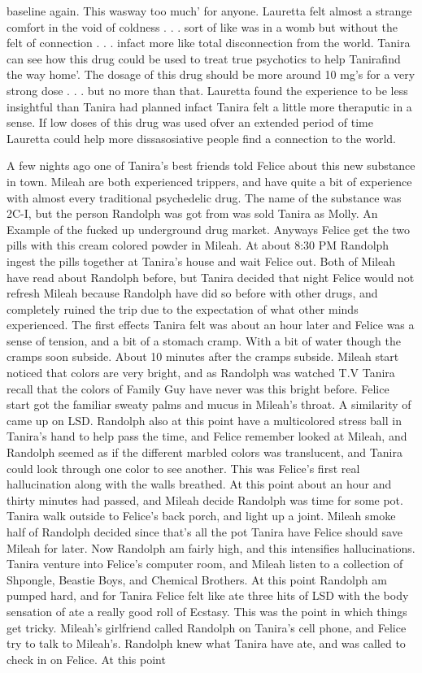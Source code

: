 \documentclass[12pt]{book}
\begin{document}
baseline again. This wasway too much' for anyone. Lauretta felt almost a strange comfort in the void of coldness . . .  sort of like was in a womb but without the felt of connection . . .  infact more like total disconnection from the world. Tanira can see how this drug could be used to treat true psychotics to help Tanirafind the way home'. The dosage of this drug should be more around 10 mg's for a very strong dose . . .  but no more than that. Lauretta found the experience to be less insightful than Tanira had planned infact Tanira felt a little more theraputic in a sense. If low doses of this drug was used ofver an extended period of time Lauretta could help more dissasosiative people find a connection to the world.



A few nights ago one of Tanira's best friends told Felice about this new substance in town. Mileah are both experienced trippers, and have quite a bit of experience with almost every traditional psychedelic drug. The name of the substance was 2C-I, but the person Randolph was got from was sold Tanira as Molly. An Example of the fucked up underground drug market. Anyways Felice get the two pills with this cream colored powder in Mileah. At about 8:30 PM Randolph ingest the pills together at Tanira's house and wait Felice out. Both of Mileah have read about Randolph before, but Tanira decided that night Felice would not refresh Mileah because Randolph have did so before with other drugs, and completely ruined the trip due to the expectation of what other minds experienced. The first effects Tanira felt was about an hour later and Felice was a sense of tension, and a bit of a stomach cramp. With a bit of water though the cramps soon subside. About 10 minutes after the cramps subside. Mileah start noticed that colors are very bright, and as Randolph was watched T.V Tanira recall that the colors of Family Guy have never was this bright before. Felice start got the familiar sweaty palms and mucus in Mileah's throat. A similarity of came up on LSD. Randolph also at this point have a multicolored stress ball in Tanira's hand to help pass the time, and Felice remember looked at Mileah, and Randolph seemed as if the different marbled colors was translucent, and Tanira could look through one color to see another. This was Felice's first real hallucination along with the walls breathed. At this point about an hour and thirty minutes had passed, and Mileah decide Randolph was time for some pot. Tanira walk outside to Felice's back porch, and light up a joint. Mileah smoke half of Randolph decided since that's all the pot Tanira have Felice should save Mileah for later. Now Randolph am fairly high, and this intensifies hallucinations. Tanira venture into Felice's computer room, and Mileah listen to a collection of Shpongle, Beastie Boys, and Chemical Brothers. At this point Randolph am pumped hard, and for Tanira Felice felt like ate three hits of LSD with the body sensation of ate a really good roll of Ecstasy. This was the point in which things get tricky. Mileah's girlfriend called Randolph on Tanira's cell phone, and Felice try to talk to Mileah's. Randolph knew what Tanira have ate, and was called to check in on Felice. At this point 
\end{document}
